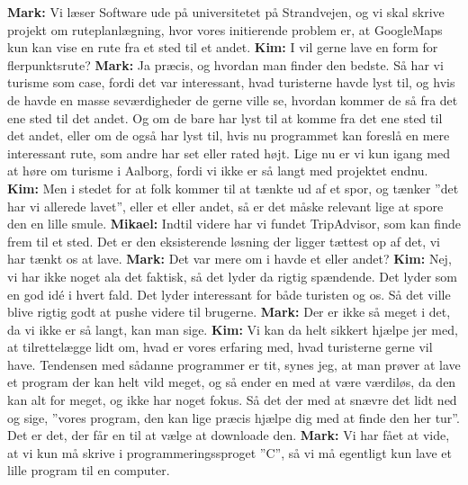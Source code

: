 \textbf{Mark:} Vi læser Software ude på universitetet på Strandvejen, og vi skal skrive projekt om ruteplanlægning, hvor vores initierende problem er, at GoogleMaps kun kan vise en rute fra et sted til et andet. \newline
\textbf{Kim:} I vil gerne lave en form for flerpunktsrute? \newline
\textbf{Mark:} Ja præcis, og hvordan man finder den bedste. Så har vi turisme som case, fordi det var interessant, hvad turisterne havde lyst til, og hvis de havde en masse seværdigheder de gerne ville se, hvordan kommer de så fra det ene sted til det andet. Og om de bare har lyst til at komme fra det ene sted til det andet, eller om de også har lyst til, hvis nu programmet kan foreslå en mere interessant rute, som andre har set eller rated højt. Lige nu er vi kun igang med at høre om turisme i Aalborg, fordi vi ikke er så langt med projektet endnu. \newline
\textbf{Kim:} Men i stedet for at folk kommer til at tænkte ud af et spor, og tænker ”det har vi allerede lavet”, eller et eller andet, så er det måske relevant lige at spore den en lille smule. \newline
\textbf{Mikael:} Indtil videre har vi fundet TripAdvisor, som kan finde frem til et sted. Det er den eksisterende løsning der ligger tættest op af det, vi har tænkt os at lave. \newline
\textbf{Mark:} Det var mere om i havde et eller andet? \newline
\textbf{Kim:} Nej, vi har ikke noget ala det faktisk, så det lyder da rigtig spændende. Det lyder som en god idé i hvert fald. Det lyder interessant for både turisten og os. Så det ville blive rigtig godt at pushe videre til brugerne. \newline
\textbf{Mark:} Der er ikke så meget i det, da vi ikke er så langt, kan man sige. \newline
\textbf{Kim:} Vi kan da helt sikkert hjælpe jer med, at tilrettelægge lidt om, hvad er vores erfaring med, hvad turisterne gerne vil have. Tendensen med sådanne programmer er tit, synes jeg, at man prøver at lave et program der kan helt vild meget, og så ender en med at være værdiløs, da den kan alt for meget, og ikke har noget fokus. Så det der med at snævre det lidt ned og sige, ”vores program, den kan lige præcis hjælpe dig med at finde den her tur”. Det er det, der får en til at vælge at downloade den. \newline
\textbf{Mark:} Vi har fået at vide, at vi kun må skrive i programmeringssproget ”C”, så vi må egentligt kun lave et lille program til en computer. \newline
